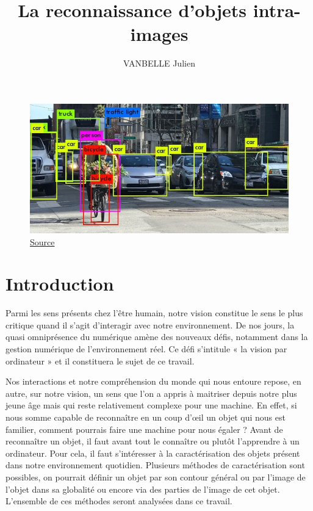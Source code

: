 \documentclass[a4paper,12pt]{article} %
\title{\textbf{La reconnaissance d'objets intra-images}} %
\author{VANBELLE Julien} %
\date{} %
\begin{document}
\maketitle %

\begin{figure}[h] %
  \centering %
  \includegraphics[scale=0.5]{illu1.jpg} %
  \caption{\href{https://www.datagenius.fr/post/reconnaissance-d-image-intelligence-artificielle-ai-compare}{Source}} %
\end{figure}
\vspace{30pt}
\tableofcontents
\newpage
\section{Introduction} %
		Parmi les sens présents chez l'être humain, notre vision constitue le sens le plus critique quand il s'agit d'interagir avec notre environnement. De nos jours, la quasi omniprésence du numérique amène des nouveaux défis, notamment dans la gestion numérique de l’environnement réel. Ce défi s’intitule « la vision par ordinateur » et il constituera le sujet de ce travail. \newline

	Nos interactions et notre compréhension du monde qui nous entoure repose, en autre, sur notre vision, un sens que l’on a appris à maitriser depuis notre plus jeune âge mais qui reste relativement complexe pour une machine. En effet, si nous somme capable de reconnaître en un coup d’œil un objet qui nous est familier, comment pourrais faire une machine pour nous égaler ? 
Avant de reconnaître un objet, il faut avant tout le connaître ou plutôt l’apprendre à un ordinateur. Pour cela, il faut s’intéresser à la caractérisation des objets présent dans notre environnement quotidien.  Plusieurs méthodes de caractérisation sont possibles, on pourrait définir un objet par son contour général ou par l’image de l’objet dans sa globalité ou encore via des parties de l’image de cet objet. L’ensemble de ces méthodes seront analysées dans ce travail. \newline
\end{document}
